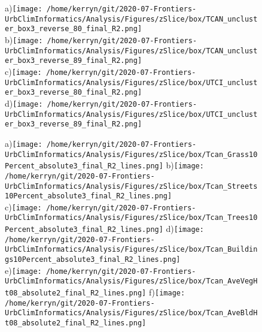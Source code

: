 \documentclass{article}
\begin{document}
%
%
\begin{figure}   %
\centering 
{\tiny a)}\texttt{[image: /home/kerryn/git/2020-07-Frontiers-UrbClimInformatics/Analysis/Figures/zSlice/box/TCAN\_uncluster\_box3\_reverse\_80\_final\_R2.png]} 
\\
{\tiny b)}\texttt{[image: /home/kerryn/git/2020-07-Frontiers-UrbClimInformatics/Analysis/Figures/zSlice/box/TCAN\_uncluster\_box3\_reverse\_89\_final\_R2.png]}
\\
{\tiny c)}\texttt{[image: /home/kerryn/git/2020-07-Frontiers-UrbClimInformatics/Analysis/Figures/zSlice/box/UTCI\_uncluster\_box3\_reverse\_80\_final\_R2.png]} 
\\  
{\tiny d)}\texttt{[image: /home/kerryn/git/2020-07-Frontiers-UrbClimInformatics/Analysis/Figures/zSlice/box/UTCI\_uncluster\_box3\_reverse\_89\_final\_R2.png]}
\end{figure} 
\clearpage















\begin{figure}           %
\centering    
{\tiny a)}\texttt{[image: /home/kerryn/git/2020-07-Frontiers-UrbClimInformatics/Analysis/Figures/zSlice/box/Tcan\_Grass10Percent\_absolute3\_final\_R2\_lines.png]}
{\tiny b)}\texttt{[image: /home/kerryn/git/2020-07-Frontiers-UrbClimInformatics/Analysis/Figures/zSlice/box/Tcan\_Streets10Percent\_absolute3\_final\_R2\_lines.png]}\\
{\tiny c)}\texttt{[image: /home/kerryn/git/2020-07-Frontiers-UrbClimInformatics/Analysis/Figures/zSlice/box/Tcan\_Trees10Percent\_absolute3\_final\_R2\_lines.png]}
{\tiny d)}\texttt{[image: /home/kerryn/git/2020-07-Frontiers-UrbClimInformatics/Analysis/Figures/zSlice/box/Tcan\_Buildings10Percent\_absolute3\_final\_R2\_lines.png]}\\
{\tiny e)}\texttt{[image: /home/kerryn/git/2020-07-Frontiers-UrbClimInformatics/Analysis/Figures/zSlice/box/Tcan\_AveVegHt08\_absolute2\_final\_R2\_lines.png]}
{\tiny f)}\texttt{[image: /home/kerryn/git/2020-07-Frontiers-UrbClimInformatics/Analysis/Figures/zSlice/box/Tcan\_AveBldHt08\_absolute2\_final\_R2\_lines.png]}
\end{figure} 
\clearpage
\end{document}
